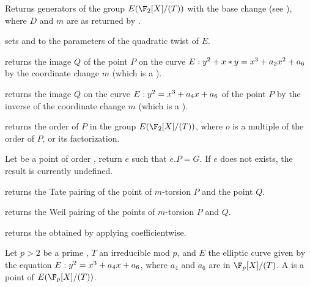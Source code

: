 Returns generators of the group $E(\F_2[X]/(T))$ with the base change 
(see ), where $D$ and $m$ are as returned by
.

sets  and  to the parameters of the quadratic twist of $E$.


 returns the image
$Q$ of the point $P$ on the curve $E:y^2+x*y=x^3+a_2\*x^2+a_6$ by the coordinate
change $m$ (which is a ).

 returns the image
$Q$ on the curve $E:y^2=x^3+a_4\*x+a_6$ of the point $P$ by the inverse of the
coordinate change $m$ (which is a ).







 returns the order of $P$ in
the group $E(\F_2[X]/(T))$, where $o$ is a multiple of the order of $P$, or its
factorization.

 Let  be a
point of order , return $e$ such that $e.P=G$. If $e$ does not exists,
the result is currently undefined.

 returns the
Tate pairing of the point of $m$-torsion $P$ and the point $Q$.

 returns the
Weil pairing of the points of $m$-torsion $P$ and $Q$.

 returns the  obtained by
applying  coefficientwise.

Let $p > 2$ be a prime , $T$ an irreducible  mod $p$, and
$E$ the elliptic curve given by the equation $E:y^2=x^3+a_4\*x+a_6$, where $a_4$
and $a_6$ are  in $\F_p[X]/(T)$.  A  is a point of
$E(\F_p[X]/(T))$.

